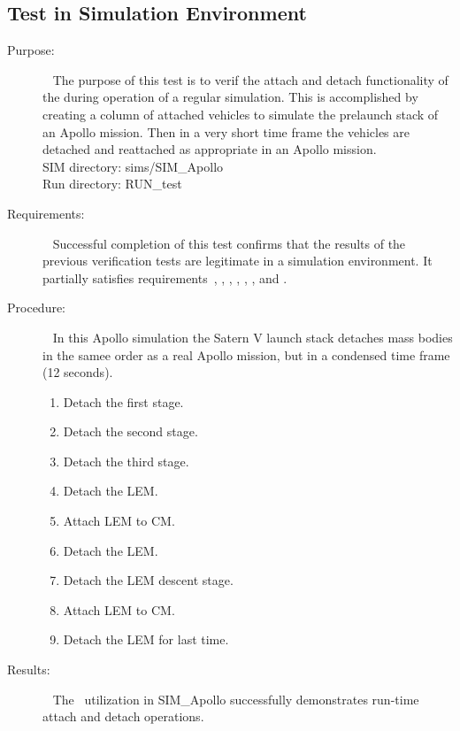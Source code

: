 \subsection{Test in Simulation Environment}
\label{test:mass_12}
\begin{description}
\item[Purpose:] \ \newline
The purpose of this test is to verif the attach and detach functionality of the
\ModelDesc during operation of a regular simulation.  This
is accomplished by creating a column of attached vehicles to simulate the 
prelaunch stack of 
an Apollo mission.  Then in a very short time frame the vehicles are detached 
and reattached 
as appropriate in an Apollo mission.\\
SIM directory: sims/SIM\_Apollo\\
Run directory: RUN\_test
\item[Requirements:] \ \newline
Successful completion of this test confirms that the results of the previous 
verification tests are legitimate in a simulation environment.  It partially satisfies requirements~, , 
, , 
, , and .
\item[Procedure:]\ \newline
In this Apollo simulation the Satern V launch stack detaches mass bodies in 
the samee order as a real Apollo mission, but 
in a condensed time frame (12 seconds).
\begin{enumerate}
\item{Detach the first stage.}
\item{Detach the second stage.}
\item{Detach the third stage.}
\item{Detach the LEM.}
\item{Attach LEM to CM.}
\item{Detach the LEM.}
\item{Detach the LEM descent stage.}
\item{Attach LEM to CM.}
\item{Detach the LEM for last time.}
\end{enumerate}
\item[Results:]\ \newline
The \ModelDesc\ utilization in SIM\_Apollo successfully demonstrates run-time 
attach and detach operations.
\end{description}

%
